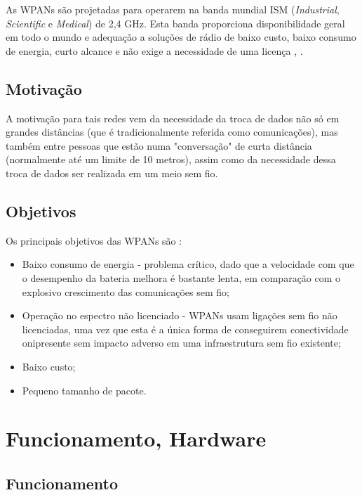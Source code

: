 \documentclass[conference]{IEEEtran}
\begin{document}
As WPANs são projetadas para operarem na banda mundial ISM (\textit{Industrial}, \textit{Scientific} e \textit{Medical}) de 2,4 GHz. Esta banda proporciona disponibilidade geral em todo o mundo e adequação a soluções de rádio de baixo custo, baixo consumo de energia, curto alcance e não exige a necessidade de uma licença \cite{marsan2002optimizing}, \cite{braley2000wireless}.


\subsection{Motivação}

A motivação para tais redes vem da necessidade da troca de dados não só em grandes distâncias (que é tradicionalmente referida como comunicações), mas também entre pessoas que estão numa "conversação" de curta distância (normalmente até um limite de 10 metros), assim como da necessidade dessa troca de dados ser realizada em um meio sem fio.


\subsection{Objetivos}

Os principais objetivos das WPANs são \cite{prasad2004ofdm}:

\begin{itemize}

 \item Baixo consumo de energia - problema crítico, dado que a velocidade com que o desempenho da bateria melhora é bastante lenta, em comparação com o explosivo crescimento das comunicações sem fio;
 \item Operação no espectro não licenciado - WPANs usam ligações sem fio não licenciadas, uma vez que esta é a única forma de conseguirem conectividade onipresente sem impacto adverso em uma infraestrutura sem fio existente;
 \item Baixo custo;
 \item Pequeno tamanho de pacote.
 
\end{itemize}


\section{Funcionamento, Hardware} \label{func_hard}

\subsection{Funcionamento}
\end{document}
